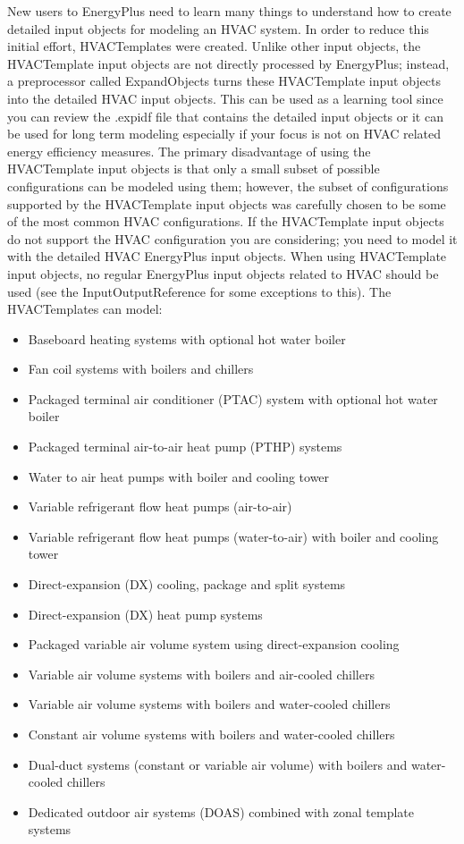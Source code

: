 New users to EnergyPlus need to learn many things to understand how
to create detailed input objects for modeling an HVAC system. In order
to reduce this initial effort, HVACTemplates were created. Unlike
other input objects, the HVACTemplate input objects are not directly
processed by EnergyPlus; instead, a preprocessor called ExpandObjects
turns these HVACTemplate input objects into the detailed HVAC input
objects. This can be used as a learning tool since you can review
the .expidf file that contains the detailed input objects or it can
be used for long term modeling especially if your focus is not on
HVAC related energy efficiency measures. The primary disadvantage
of using the HVACTemplate input objects is that only a small subset
of possible configurations can be modeled using them; however, the
subset of configurations supported by the HVACTemplate input objects
was carefully chosen to be some of the most common HVAC configurations.
If the HVACTemplate input objects do not support the HVAC configuration
you are considering; you need to model it with the detailed HVAC EnergyPlus
input objects. When using HVACTemplate input objects, no regular EnergyPlus
input objects related to HVAC should be used (see the InputOutputReference
for some exceptions to this). The HVACTemplates can model:
\begin{itemize}
\item Baseboard heating systems with optional hot water boiler
\item Fan coil systems with boilers and chillers
\item Packaged terminal air conditioner (PTAC) system with optional hot
water boiler
\item Packaged terminal air-to-air heat pump (PTHP) systems
\item Water to air heat pumps with boiler and cooling tower
\item Variable refrigerant flow heat pumps (air-to-air)
\item Variable refrigerant flow heat pumps (water-to-air) with boiler and
cooling tower
\item Direct-expansion (DX) cooling, package and split systems
\item Direct-expansion (DX) heat pump systems
\item Packaged variable air volume system using direct-expansion cooling
\item Variable air volume systems with boilers and air-cooled chillers
\item Variable air volume systems with boilers and water-cooled chillers
\item Constant air volume systems with boilers and water-cooled chillers
\item Dual-duct systems (constant or variable air volume) with boilers and
water-cooled chillers
\item Dedicated outdoor air systems (DOAS) combined with zonal template
systems
\end{itemize}
